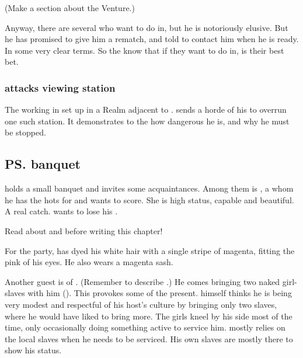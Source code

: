 (Make a section about the \CiriathSepher \Malcur Venture.)

Anyway, there are several \resphain who want to do \Ishnaruchaefir in, but he is notoriously elusive.
But he has promised \Teshrial to give him a rematch, and told \Teshrial to contact him when he is ready.
In some very clear terms.
So the \resphain know that if they want to do \Ishnaruchaefir in, \Teshrial is their best bet.





\subsubsection{\Ishnaruchaefir attacks viewing station}
The \resphain working in \Malcur {} set up in a Realm adjacent to \Azmith. 
\Ishnaruchaefir sends a horde of his \daemons to overrun one such station. 
It demonstrates to the \resphain how dangerous he is, and why he must be stopped.









\subsection{\ps{\Teshrial} banquet}
\Teshrial{} holds a small banquet and invites some \ketheran{} acquaintances. 
Among them is \Firaxel, a \resvil{} whom he has the hots for and wants to score. 
She is high status, capable and beautiful. 
A real catch. 
\Teshrial{} wants to lose his . 

Read about  and  before writing this chapter!

For the party, \Teshrial{} has dyed his white hair with a single stripe of magenta, fitting the pink of his eyes. 
He also wears a magenta sash. 

Another guest is  of \Mystraacht. 
(Remember to describe .) 
He comes bringing two naked girl-slaves with him (). 
This provokes some of the \CiriathSepher{} present. 
\Dezruth{} himself thinks he is being very modest and respectful of his host's culture by bringing only two slaves, where he would have liked to bring more. 
The girls kneel by his side most of the time, only occasionally doing something active to service him. 
\Dezruth{} mostly relies on the local slaves when he needs to be serviced. 
His own slaves are mostly there to show his status. 

